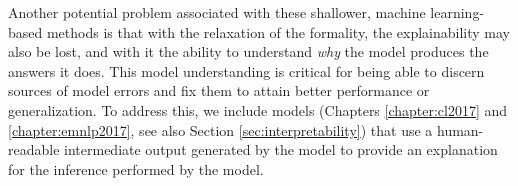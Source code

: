 Another potential problem associated with these shallower, machine learning-based methods is that with the relaxation of the formality, the explainability may also be lost, and with it the ability to understand \emph{why} the model produces the answers it does.  This model understanding is critical for being able to discern sources of model errors and fix them to attain better performance or generalization. 
To address this, we include models (Chapters \ref{chapter:cl2017} and \ref{chapter:emnlp2017}, see also Section \ref{sec:interpretability}) that use a human-readable intermediate output generated by the model to provide an explanation for the inference performed by the model.





